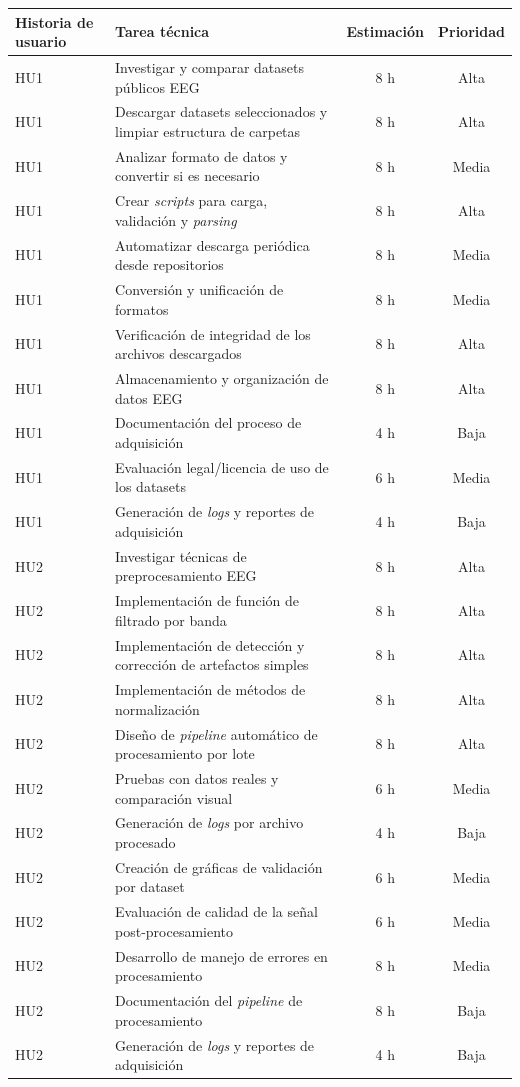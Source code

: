 \documentclass[
11pt, %
]{charter}
\begin{document}
\begin{table}[htpb]
\centering
\begin{tabularx}{\linewidth}{@{}|X|X|c|c|@{}}
\hline
\rowcolor[HTML]{C0C0C0}
Historia de usuario & Tarea técnica & Estimación & Prioridad \\ \hline
HU1 & Investigar y comparar datasets públicos EEG & 8 h & Alta \\ \hline
HU1 & Descargar datasets seleccionados y limpiar estructura de carpetas & 8 h & Alta \\ \hline
HU1 & Analizar formato de datos y convertir si es necesario	 & 8 h & Media \\ \hline
HU1 & Crear \textit{scripts} para carga, validación y \textit{parsing}		 & 8 h & Alta \\ \hline
HU1 & Automatizar descarga periódica desde repositorios			 & 8 h & Media \\ \hline
HU1 & Conversión y unificación de formatos		 & 8 h & Media \\ \hline
HU1 & Verificación de integridad de los archivos descargados			 & 8 h & Alta \\ \hline
HU1 & Almacenamiento y organización de datos EEG				 & 8 h & Alta \\ \hline
HU1 & Documentación del proceso de adquisición				 & 4 h & Baja \\ \hline
HU1 & Evaluación legal/licencia de uso de los datasets				 & 6 h & Media \\ \hline
HU1 & Generación de \textit{logs} y reportes de adquisición				 & 4 h & Baja \\ \hline
HU2 & Investigar técnicas de preprocesamiento EEG						 & 8 h & Alta \\ \hline
HU2 & Implementación de función de filtrado por banda					 & 8 h & Alta \\ \hline
HU2 & Implementación de detección y corrección de artefactos simples					 & 8 h & Alta \\ \hline
HU2 & Implementación de métodos de normalización 					 & 8 h & Alta \\ \hline
HU2 & Diseño de \textit{pipeline} automático de procesamiento por lote					 & 8 h & Alta \\ \hline
HU2 & Pruebas con datos reales y comparación visual					 & 6 h & Media \\ \hline
HU2 & Generación de \textit{logs} por archivo procesado				 & 4 h & Baja \\ \hline
HU2 & Creación de gráficas de validación por dataset					 & 6 h & Media \\ \hline
HU2 & Evaluación de calidad de la señal post-procesamiento					 & 6 h & Media \\ \hline
HU2 & Desarrollo de manejo de errores en procesamiento					 & 8 h & Media \\ \hline
HU2 & Documentación del \textit{pipeline} de procesamiento					 & 8 h & Baja \\ \hline
HU2 & Generación de \textit{logs} y reportes de adquisición				 & 4 h & Baja \\ \hline


\end{tabularx}
\end{table}
\end{document}
